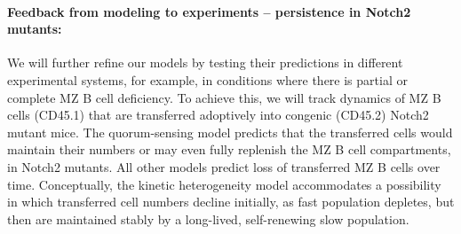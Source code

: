 \documentclass[11pt]{article}
\newcommand{\para}[1]{\vspace*{-4.5mm}\paragraph{#1}}
\begin{document}
\para{{Feedback from modeling to experiments -- persistence in Notch2 mutants:}}
We will further refine our models by testing their predictions in different experimental systems, for example, in conditions where there is partial or complete MZ B cell deficiency.
To achieve this, we will track dynamics of MZ B cells (CD45.1) that are transferred adoptively into congenic (CD45.2)  Notch2 mutant mice. %
The quorum-sensing model predicts that the transferred cells would maintain their numbers or may even fully replenish the MZ B cell compartments, in Notch2 mutants.
All other models predict loss of transferred MZ B cells over time.
Conceptually, the kinetic heterogeneity model accommodates a possibility in which transferred cell numbers decline initially, as fast population depletes, but then are maintained stably by a long-lived, self-renewing slow population.
%
\end{document}
